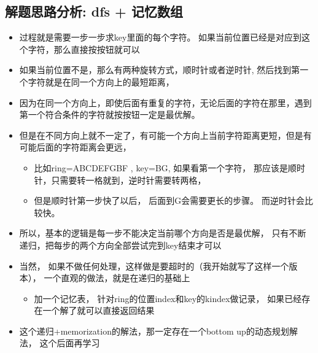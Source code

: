 \documentclass[9pt, b5paaper]{book}
\begin{document}
\subsection{解题思路分析: dfs + 记忆数组}
\label{sec-2-14-3}
\begin{itemize}
\item 过程就是需要一步一步求key里面的每个字符。 如果当前位置已经是对应到这个字符，那么直接按按钮就可以
\item 如果当前位置不是，那么有两种旋转方式，顺时针或者逆时针, 然后找到第一个字符就是在同一个方向上的最短距离，
\item 因为在同一个方向上，即使后面有重复的字符，无论后面的字符在那里，遇到第一个符合条件的字符就按按钮一定是最优解。
\item 但是在不同方向上就不一定了，有可能一个方向上当前字符距离更短，但是有可能后面的字符距离会更远，
\begin{itemize}
\item 比如ring=ABCDEFGBF , key=BG, 如果看第一个字符， 那应该是顺时针，只需要转一格就到，逆时针需要转两格，
\item 但是顺时针第一步快了以后， 后面到G会需要更长的步骤。 而逆时针会比较快。
\end{itemize}
\item 所以，基本的逻辑是每一步不能决定当前哪个方向是否是最优解， 只有不断递归，把每步的两个方向全部尝试完到key结束才可以
\item 当然， 如果不做任何处理，这样做是要超时的（我开始就写了这样一个版本）， 一个直观的做法，就是在递归的基础上
\begin{itemize}
\item 加一个记忆表， 针对ring的位置index和key的kindex做记录， 如果已经存在一个解了就可以直接返回结果
\end{itemize}
\item 这个递归+memorization的解法，那一定存在一个bottom up的动态规划解法， 这个后面再学习
\end{itemize}
\end{document}
